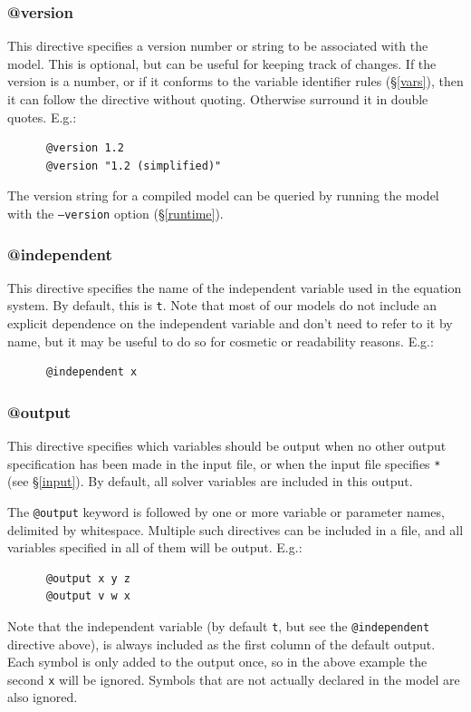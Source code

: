 \documentclass[a4paper,11pt]{article}
\begin{document}
\subsubsection{@version}
This directive specifies a version number or string to be associated with the model. This is optional, but can be useful for keeping track of changes. If the version is a number, or if it conforms to the variable identifier rules (\S\ref{vars}), then it can follow the directive without quoting. Otherwise surround it in double quotes. E.g.:
\begin{verbatim}
      @version 1.2
      @version "1.2 (simplified)"
\end{verbatim}
The version string for a compiled model can be queried by running the model with the \texttt{--version} option (\S\ref{runtime}).

\subsubsection{@independent}
This directive specifies the name of the independent variable used in the equation system. By default, this is \texttt{t}. Note that most of our models do not include an explicit dependence on the independent variable and don't need to refer to it by name, but it may be useful to do so for cosmetic or readability reasons. E.g.:
\begin{verbatim}
      @independent x
\end{verbatim}

\subsubsection{@output}\label{at:output}
This directive specifies which variables should be output when no other output specification has been made in the input file, or when the input file specifies \texttt{*} (see \S\ref{input}). By default, all solver variables are included in this output.

The \texttt{@output} keyword is followed by one or more variable or parameter names, delimited by whitespace. Multiple such directives can be included in a file, and all variables specified in all of them will be output. E.g.:
\begin{verbatim}
      @output x y z
      @output v w x
\end{verbatim}
Note that the independent variable (by default \texttt{t}, but see the \texttt{@independent} directive above), is always included as the first column of the default output. Each symbol is only added to the output once, so in the above example the second \texttt{x} will be ignored. Symbols that are not actually declared in the model are also ignored.
\end{document}
